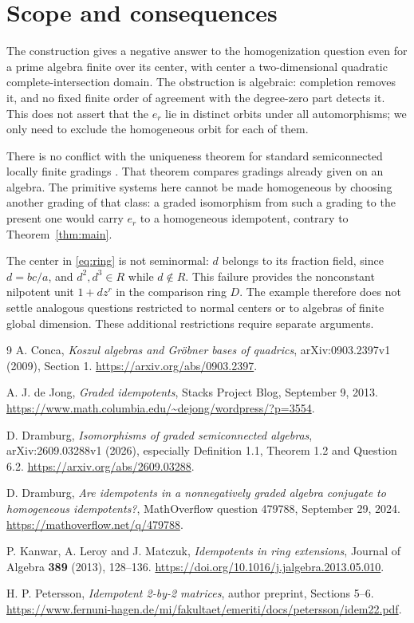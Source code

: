 \documentclass[11pt]{article}
\theoremstyle{remark}
\begin{document}
\section{Scope and consequences}

The construction gives a negative answer to the homogenization question even for a prime algebra finite over its center, with center a two-dimensional quadratic complete-intersection domain. The obstruction is algebraic: completion removes it, and no fixed finite order of agreement with the degree-zero part detects it. This does not assert that the $e_r$ lie in distinct orbits under all automorphisms; we only need to exclude the homogeneous orbit for each of them.

There is no conflict with the uniqueness theorem for standard semiconnected locally finite gradings \cite[Theorem 1.2]{Dramburg}. That theorem compares gradings already given on an algebra. The primitive systems here cannot be made homogeneous by choosing another grading of that class: a graded isomorphism from such a grading to the present one would carry $e_r$ to a homogeneous idempotent, contrary to Theorem~\ref{thm:main}.

The center in \eqref{eq:ring} is not seminormal: $d$ belongs to its fraction field, since $d=bc/a$, and $d^2,d^3\in R$ while $d\notin R$. This failure provides the nonconstant nilpotent unit $1+dz^r$ in the comparison ring $D$. The example therefore does not settle analogous questions restricted to normal centers or to algebras of finite global dimension. These additional restrictions require separate arguments.

\begin{thebibliography}{9}
A. Conca, \emph{Koszul algebras and Gr\"obner bases of quadrics}, arXiv:0903.2397v1 (2009), Section 1. \url{https://arxiv.org/abs/0903.2397}.

A. J. de Jong, \emph{Graded idempotents}, Stacks Project Blog, September 9, 2013. \url{https://www.math.columbia.edu/~dejong/wordpress/?p=3554}.

D. Dramburg, \emph{Isomorphisms of graded semiconnected algebras}, arXiv:2609.03288v1 (2026), especially Definition 1.1, Theorem 1.2 and Question 6.2. \url{https://arxiv.org/abs/2609.03288}.

D. Dramburg, \emph{Are idempotents in a nonnegatively graded algebra conjugate to homogeneous idempotents?}, MathOverflow question 479788, September 29, 2024. \url{https://mathoverflow.net/q/479788}.

P. Kanwar, A. Leroy and J. Matczuk, \emph{Idempotents in ring extensions}, Journal of Algebra \textbf{389} (2013), 128--136. \url{https://doi.org/10.1016/j.jalgebra.2013.05.010}.

H. P. Petersson, \emph{Idempotent 2-by-2 matrices}, author preprint, Sections 5--6. \url{https://www.fernuni-hagen.de/mi/fakultaet/emeriti/docs/petersson/idem22.pdf}.
\end{thebibliography}
\end{document}
